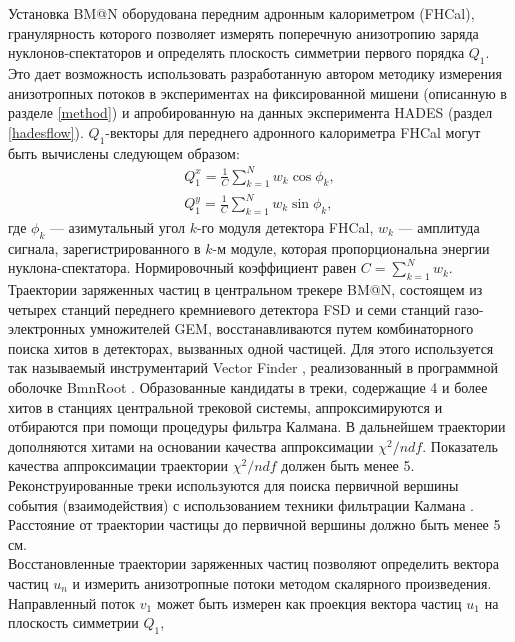 Установка BM@N \cite{Afanasiev:2023opv} оборудована передним адронным калориметром  (FHCal), гранулярность которого позволяет измерять поперечную анизотропию заряда нуклонов-спектаторов и определять плоскость симметрии первого порядка $Q_1$. 
Это дает возможность использовать разработанную автором методику измерения анизотропных потоков в экспериментах на фиксированной мишени (описанную в разделе \ref{method}) и апробированную на  данных эксперимента HADES (раздел \ref{hadesflow}).
$Q_1$-векторы для переднего адронного калориметра FHCal могут быть вычислены  следующем образом:
\begin{equation}
    \begin{align}
        Q_1^x = \frac{1}{C} \sum_{k=1}^N w_k \cos \phi_k, \\
        Q_1^y = \frac{1}{C} \sum_{k=1}^N w_k \sin \phi_k,
    \end{align}
    \label{eq:qvector_bmn}
\end{equation}
где $\phi_k$ --- азимутальный угол $k$-го модуля  детектора FHCal, $w_k$ --- амплитуда сигнала, зарегистрированного в
$k$-м модуле, которая пропорциональна энергии нуклона-спектатора.  Нормировочный коэффициент равен $C=\sum_{k=1}^{N} w_k$.\\
Траектории заряженных частиц в центральном трекере BM@N, состоящем из четырех станций переднего кремниевого детектора FSD и семи станций газо-электронных умножителей GEM,
восстанавливаются путем комбинаторного поиска хитов в  детекторах, вызванных одной частицей. Для этого используется так называемый инструментарий 
Vector Finder \cite{Zinchenko:2024kut}, реализованный в программной оболочке BmnRoot \cite{Batyuk:2019ohs}. Образованные кандидаты в треки, содержащие 4 и более хитов в станциях
центральной трековой системы, аппроксимируются и отбираются при помощи процедуры фильтра Калмана. В дальнейшем траектории дополняются хитами на основании качества аппроксимации $\chi^2/ndf$. 
Показатель качества аппроксимации траектории $\chi^2/ndf$ должен быть менее 5.
Реконструированные треки используются для поиска первичной  вершины события (взаимодействия) с использованием техники фильтрации Калмана \cite{Luchsinger:1992np}. 
Расстояние от траектории частицы  до первичной вершины должно быть менее 5 см.\\
Восстановленные траектории заряженных частиц позволяют определить  вектора частиц $u_n$ и измерить анизотропные потоки методом скалярного произведения. \\
Направленный поток $v_1$  может быть измерен  как проекция вектора частиц $u_1$ на плоскость симметрии $Q_1$, 
